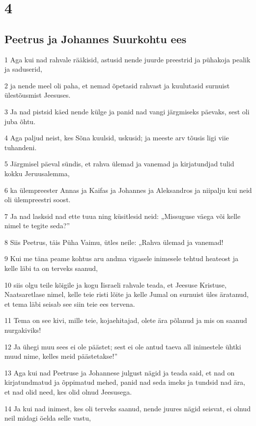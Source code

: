 \chapter{4}

\section*{Peetrus ja Johannes Suurkohtu ees}

\par 1 Aga kui nad rahvale rääkisid, astusid nende juurde preestrid ja pühakoja pealik ja saduserid,
\par 2 ja nende meel oli paha, et nemad õpetasid rahvast ja kuulutasid surnuist ülestõusmist Jeesuses.
\par 3 Ja nad pistsid käed nende külge ja panid nad vangi järgmiseks päevaks, sest oli juba õhtu.
\par 4 Aga paljud neist, kes Sõna kuulsid, uskusid; ja meeste arv tõusis ligi viie tuhandeni.
\par 5 Järgmisel päeval sündis, et rahva ülemad ja vanemad ja kirjatundjad tulid kokku Jeruusalemma,
\par 6 ka ülempreester Annas ja Kaifas ja Johannes ja Aleksandros ja niipalju kui neid oli ülempreestri soost.
\par 7 Ja nad lasksid nad ette tuua ning küsitlesid neid: „Missuguse väega või kelle nimel te tegite seda?”
\par 8 Siis Peetrus, täis Püha Vaimu, ütles neile: „Rahva ülemad ja vanemad!
\par 9 Kui me täna peame kohtus aru andma vigasele inimesele tehtud heateost ja kelle läbi ta on terveks saanud,
\par 10 siis olgu teile kõigile ja kogu Iisraeli rahvale teada, et Jeesuse Kristuse, Naatsaretlase nimel, kelle teie risti lõite ja kelle Jumal on surnuist üles äratanud, et tema läbi seisab see siin teie ees tervena.
\par 11 Tema on see kivi, mille teie, kojaehitajad, olete ära põlanud ja mis on saanud nurgakiviks!
\par 12 Ja ühegi muu sees ei ole päästet; sest ei ole antud taeva all inimestele ühtki muud nime, kelles meid päästetakse!”
\par 13 Aga kui nad Peetruse ja Johannese julgust nägid ja teada said, et nad on kirjatundmatud ja õppimatud mehed, panid nad seda imeks ja tundsid nad ära, et nad olid need, kes olid olnud Jeesusega.
\par 14 Ja kui nad inimest, kes oli terveks saanud, nende juures nägid seisvat, ei olnud neil midagi öelda selle vastu,
